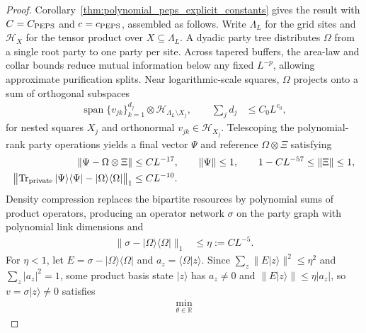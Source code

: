 \begin{proof}
    \leanok
    Corollary~\ref{thm:polynomial_peps_explicit_constants} gives the result with
    $C=C_{\rm PEPS}$ and $c=c_{\rm PEPS}$, assembled as follows. Write
    $\Lambda_L$ for the grid sites and $\mathcal H_X$ for the tensor product
    over $X\subseteq\Lambda_L$. A dyadic party tree distributes $\Omega$ from a
    single root party to one party per site. Across tapered buffers, the
    area-law and collar bounds reduce mutual information below any fixed
    $L^{-p}$, allowing approximate purification splits. Near logarithmic-scale
    squares, $\Omega$ projects onto a sum of orthogonal subspaces
    \begin{align}
        \operatorname{span}\{v_{jk}\}_{k=1}^{d_j}
        \otimes\mathcal H_{\Lambda_L\setminus X_j},
        \qquad
        \sum_jd_j & \le C_0L^{c_0},
        \label{eq:polynomial_peps_rank_bound}
    \end{align}
    for nested squares $X_j$ and orthonormal $v_{jk}\in\mathcal H_{X_j}$.
    Telescoping the polynomial-rank party operations yields a final vector
    $\Psi$ and reference $\Omega\otimes\Xi$ satisfying
    \begin{align}
        \|\Psi-\Omega\otimes\Xi\| & \le CL^{-17},
        \qquad\|\Psi\|\le1,
        \qquad 1-CL^{-57}\le\|\Xi\|\le1,
        \label{eq:polynomial_peps_protocol_error} \\
        \bigl\|\operatorname{Tr}_{\rm private}|\Psi\rangle\langle\Psi|
        -|\Omega\rangle\langle\Omega|\bigr\|_1
                                  & \le CL^{-10}.
        \label{eq:polynomial_peps_protocol_density}
    \end{align}
    Density compression replaces the bipartite resources by polynomial sums of
    product operators, producing an operator network $\sigma$ on the party graph
    with polynomial link dimensions and
    \begin{align}
        \bigl\|\sigma-|\Omega\rangle\langle\Omega|\bigr\|_1
         & \le\eta:=CL^{-5}.
        \label{eq:polynomial_peps_compressed_density}
    \end{align}
    For $\eta<1$, let $E=\sigma-|\Omega\rangle\langle\Omega|$ and
    $a_z=\langle\Omega|z\rangle$. Since $\sum_z\|E|z\rangle\|^2\le\eta^2$ and
    $\sum_z|a_z|^2=1$, some product basis state $|z\rangle$ has $a_z\ne0$ and
    $\|E|z\rangle\|\le\eta|a_z|$, so $v=\sigma|z\rangle\ne0$ satisfies
    \begin{align}
        \min_{\theta\in\mathbb R}

\end{align}
\end{proof}
